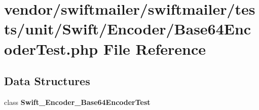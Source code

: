 \section{vendor/swiftmailer/swiftmailer/tests/unit/\+Swift/\+Encoder/\+Base64\+Encoder\+Test.php File Reference}
\label{_base64_encoder_test_8php}
\subsection*{Data Structures}
\begin{DoxyCompactItemize}
\item 
class {\bf Swift\+\_\+\+Encoder\+\_\+\+Base64\+Encoder\+Test}
\end{DoxyCompactItemize}
